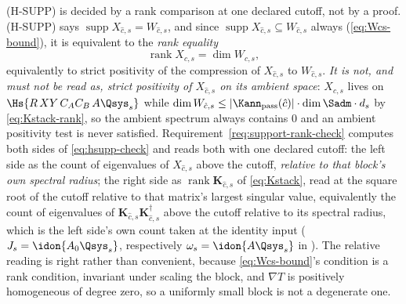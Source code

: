 
\begin{remark}\label{rem:fo-one-ruler}
(H-SUPP) is decided by a rank comparison at one declared cutoff, not by a
proof. (H-SUPP) says $\operatorname{supp}X_{\hat c,s}=W_{\hat c,s}$, and
since $\operatorname{supp}X_{\hat c,s}\subseteq W_{\hat c,s}$ always
(\eqref{eq:Wcs-bound}), it is equivalent to the \emph{rank equality}
\begin{equation}\label{eq:hsupp-check}
  \operatorname{rank}X_{\hat c,s}=\dim W_{\hat c,s},
\end{equation}
equivalently to strict positivity of the compression of $X_{\hat c,s}$ to
$W_{\hat c,s}$. \emph{It is not, and must not be read as, strict positivity
of $X_{\hat c,s}$ on its ambient space}: $X_{\hat c,s}$ lives on
$\Hs{R\,XY\,C_AC_B\,A\Qsys_s}$ while $\dim W_{\hat c,s}\le
|\Kann_{\mathrm{pass}}(\hat c)|\cdot\dim\Sadm\cdot d_s$ by
\eqref{eq:Kstack-rank}, so the ambient spectrum always contains $0$ and an
ambient positivity test is never satisfied.
Requirement~\ref{req:support-rank-check} computes both sides of
\eqref{eq:hsupp-check} and reads both with one declared cutoff: the left side
as the count of eigenvalues of $X_{\hat c,s}$ above the cutoff,
\emph{relative to that block's own spectral radius}; the right side as
$\operatorname{rank}\mathbf K_{\hat c,s}$ of \eqref{eq:Kstack}, read at the
square root of the cutoff relative to that matrix's largest singular value,
equivalently the count of eigenvalues of
$\mathbf K_{\hat c,s}\mathbf K_{\hat c,s}^{\dagger}$ above the cutoff
relative to its spectral radius, which is the left side's own count taken at
the identity input ($J_s=\idon{A_0\Qsys_s}$, respectively
$\omega_s=\idon{A\Qsys_s}$ in ). The relative
reading is right rather than convenient, because \eqref{eq:Wcs-bound}'s
condition is a rank condition, invariant under scaling the block, and
$\nabla T$ is positively homogeneous of degree zero, so a uniformly small
block is not a degenerate one.


\end{remark}

